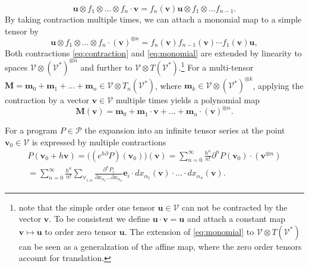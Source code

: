 \documentclass[smallcondensed]{svjour3}
\newcommand{\bfM}{\mathbf{M}}
\newcommand{\bfm}{\mathbf{m}}
\newcommand{\VV}{\mathcal{V}}
\newcommand{\e}{\mathbf{e}}
\newcommand{\uu}{\mathbf{u}}
\newcommand{\vv}{\mathbf{v}}
\newcommand{\dP}{\mathcal{P}}
\newcommand{\D}{\partial}
\begin{document}
 \begin{equation}
   \label{eq:contraction}
 \uu\otimes f_1\otimes\ldots\otimes f_n\cdot \vv = f_n(\vv) \uu\otimes f_1\otimes\ldots f_{n-1}.
\end{equation}
By taking contraction multiple times, we can attach a monomial map to a
simple tensor by  
 \begin{equation}
   \label{eq:monomial}
 \uu\otimes f_1\otimes\ldots\otimes f_n\cdot (\vv)^{\otimes n} = f_n(\vv)f_{n-1}(\vv)\cdots f_1(\vv) \uu,
\end{equation}
Both contractions \eqref{eq:contraction} and \eqref{eq:monomial} are extended
by linearity to spaces $\VV\otimes \left(\VV^*\right)^{\otimes n}$ and further
to $\VV\otimes T(\VV^*)$.\footnote{note that the simple order one tensor
  $\uu\in\VV$ can not be contracted by the vector $\vv$. To be consistent we
  define $\uu\cdot \vv = \uu$ and attach a constant map
  $\vv\mapsto \uu$ to order zero tensor $\uu$. The extension of
  \eqref{eq:monomial}
  to $\VV\otimes T(\VV^*)$ can be seen as a generalzation of the affine map,
  where the zero order tensors account for translation.}
For a multi-tensor $\bfM=\bfm_0+\bfm_1+\ldots+\bfm_n\in\VV\otimes T_n(\VV^*)$,
where $\bfm_k\in\VV\otimes\left( \VV^*\right)^{\otimes k}$, applying the
contraction by a vector $\vv\in \VV$ multiple times yields a polynomial map
\begin{equation}
  \label{eq:polynomial_tensor}
  \bfM(\vv) = \bfm_0+\bfm_1\cdot \vv+\ldots+\bfm_n\cdot (\vv)^{\otimes n}.
\end{equation}
\begin{theorem}\label{izr:e^d}
	For a program $P\in\dP$  the expansion into an infinite tensor series
  at the point $\vv_0\in \VV$ is expressed by multiple contractions 
	\begin{multline}\label{eq:tenzorVrsta}
	P(\vv_0+h\vv) = \Big((e^{h\D}P)(\vv_0)\Big)(\vv)
  = \sum_{n=0}^\infty\frac{h^n}{n!}\D^nP(\vv_0)\cdot (\vv^{\otimes n})\\
  = \sum_{n=0}^\infty \frac{h^n}{n!}\sum_{\forall_{i,\alpha}}\frac{\partial^nP_i}{\partial
 		    x_{\alpha_1}\ldots \partial x_{\alpha_n}}\e_i\cdot
 		  dx_{\alpha_1}(\vv)\cdot\ldots \cdot dx_{\alpha_n}(\vv).
	\end{multline}
\end{theorem}
 
\end{document}
